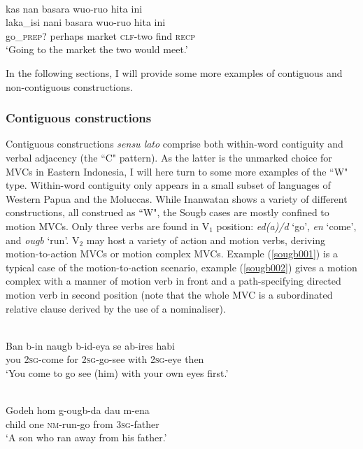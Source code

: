\ea \label{waimaqa004}
\\
\glll kas nan basara wuo-ruo hita ini \\ 
laka\_isi nani basara wuo-ruo hita ini \\
go\_\textsc{prep?} perhaps market \textsc{clf}-two find \textsc{recp} \\
\glft `Going to the market the two would meet.'\\ 
\z

In the following sections, I will provide some more examples of contiguous and non-contiguous constructions. 

\subsubsection{Contiguous constructions}

Contiguous constructions \textit{sensu lato} comprise both within-word contiguity and verbal adjacency (the ``C" pattern). As the latter is the unmarked choice for MVCs in Eastern Indonesia, I will here turn to some more examples of the ``W" type. Within-word contiguity only appears in a small subset of languages of Western Papua and the Moluccas. While Inanwatan shows a variety of different constructions, all construed as ``W", the Sougb cases are mostly confined to motion MVCs. Only three verbs are found in V$_1$ position: \textit{ed(a)/d} `go', \textit{en} `come', and \textit{ougb} `run'. V$_2$ may host a variety of action and motion verbs, deriving motion-to-action MVCs or motion complex MVCs. Example (\ref{sougb001}) is a typical case of the motion-to-action scenario, example (\ref{sougb002}) gives a motion complex with a manner of motion verb in front and a path-specifying directed motion verb in second position (note that the whole MVC is a subordinated relative clause derived by the use of a nominaliser).

\ea \label{sougb001}
\\
\gll Ban b-in naugb b-id-eya se ab-ires habi \\
you 2\textsc{sg}-come for 2\textsc{sg}-go-see with 2\textsc{sg}-eye then \\
\glft `You come to go see (him) with your own eyes first.'\\ 
\z

\ea \label{sougb002}
\\
\gll Godeh hom g-ougb-da dau m-ena \\
child one \textsc{nm}-run-go from 3\textsc{sg}-father \\
\glft `A son who ran away from his father.'\\ 
\z

